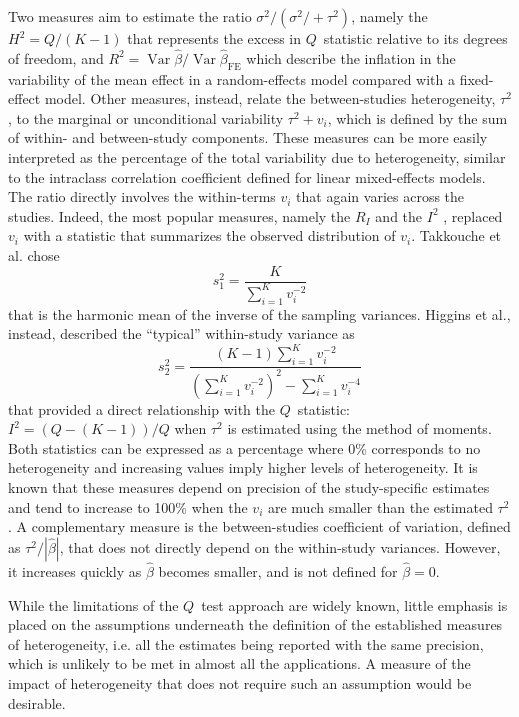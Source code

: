 \documentclass[11pt,a4paper,twoside,openany]{book}\usepackage{knitr}
\DeclareMathOperator{\Var}{Var}
\begin{document}
{Two measures aim to estimate the ratio $\sigma^2/(\sigma^2/ + \tau^2)$, namely the $H^2= Q/(K-1)$ that represents the excess in $Q$~statistic relative to its degrees of freedom, and $R^2 = \Var{\hat \beta}/\Var{\hat \beta_{\text{FE}}}$ which describe the inflation in the variability of the mean effect in a random-effects model compared with a fixed-effect model.
Other measures, instead, relate the between-studies heterogeneity, $\tau^2$, to the marginal or unconditional variability $\tau^2 + v_i$, which is defined by the sum of within- and between-study components. These measures can be more easily interpreted as the percentage of the total variability due to heterogeneity, similar to the intraclass correlation coefficient defined for linear mixed-effects models. The ratio directly involves the within-terms $v_i$ that again varies across the studies. Indeed, the most popular measures, namely the $R_I$ \citep{ takkouche1999evaluation} and the $I^2$ \citep{higgins2002quantifying}, replaced $v_i$ with a statistic that summarizes the observed distribution of $v_i$.
Takkouche et al. chose
\begin{equation}
s_1^2 = \frac{K}{\sum_{i=1}^K v_i^{-2}}
\label{eq:Ri}
\end{equation}
\noindent that is the harmonic mean of the inverse of the sampling variances. 
Higgins et al., instead, described the ``typical'' within-study variance as
\begin{equation}
s_2^2 = \frac{(K-1) \sum_{i=1}^K v_i^{-2}}{ \left( \sum_{i=1}^K v_i^{-2} \right)^2 - \sum_{i=1}^K v_i^{-4}}
\label{eq:I2}
\end{equation}
\noindent that provided a direct relationship with the $Q$~statistic: $I^2 = (Q - (K-1))/Q$ when $\tau^2$ is estimated using the method of moments.
\noindent Both statistics can be expressed as a percentage where 0\% corresponds to no heterogeneity and increasing values imply higher levels of heterogeneity. It is known that these measures depend on precision of the study-specific estimates and tend to increase to 100\% when the $v_i$ are much smaller than the estimated $\tau^2$. 
A complementary measure is the between-studies coefficient of variation, defined as $\tau^2/|\hat \beta|$, that does not directly depend on the within-study variances. However, it increases quickly as $\hat \beta$ becomes smaller, and is not defined for $\hat \beta = 0$.

While the limitations of the $Q$~test approach are widely known, little emphasis is placed on the assumptions underneath the definition of the established measures of heterogeneity, i.e.  all the estimates being reported with the same precision, which is unlikely to be met in almost all the applications. A measure of the impact of heterogeneity that does not require such an assumption would be desirable.


}
\end{document}
